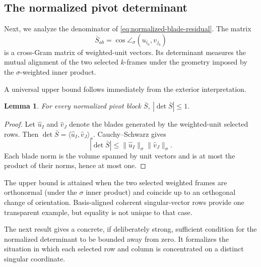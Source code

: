\documentclass[11pt, preprint]{article}
\newtheorem{lemma}[theorem]{Lemma}
\newcommand{\inner}[1]{\langle #1\rangle}
\begin{document}
\subsection{The normalized pivot determinant}\label{sec:denom_det}

Next, we analyze the denominator of \eqref{eq:normalized-blade-residual}. The matrix
\[
\bar S_{ab}=\cos\angle_\sigma(u_{i_a},v_{j_b})
\]
is a cross-Gram matrix of weighted-unit vectors. Its determinant measures the mutual alignment of the two selected $k$-frames under the geometry imposed by the $\sigma$-weighted inner product.

A universal upper bound follows immediately from the exterior interpretation.

\begin{lemma} \label{lem:simple_denom_det_bound}
For every normalized pivot block $\bar S$,
\(
|\det\bar S|\leq1.
\)
\end{lemma}

\begin{proof}
Let $\widehat u_I$ and $\widehat v_J$ denote the blades generated by the weighted-unit selected rows. Then
\(
\det\bar S=\inner{\widehat u_I,\widehat v_J}_\sigma.
\)
Cauchy--Schwarz gives
\[
|\det\bar S|
\leq
\|\widehat u_I\|_\sigma\|\widehat v_J\|_\sigma.
\]
Each blade norm is the volume spanned by unit vectors and is at most the product of their norms, hence at most one.
\end{proof}

The upper bound is attained when the two selected weighted frames are orthonormal (under the $\sigma$ inner product) and coincide up to an orthogonal change of orientation. Basis-aligned coherent singular-vector rows provide one transparent example, but equality is not unique to that case.

The next result gives a concrete, if deliberately strong, sufficient condition for the normalized determinant to be bounded away from zero. It formalizes the situation in which each selected row and column is concentrated on a distinct singular coordinate.
\end{document}
